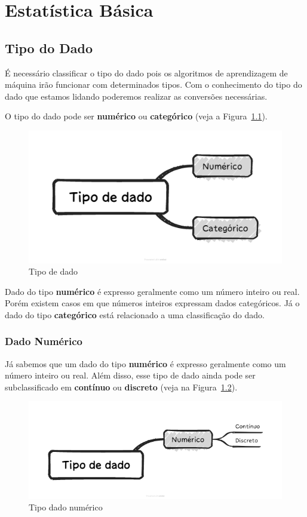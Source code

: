 \documentclass[a4paper,12pt]{book}
\begin{document}
	\chapter{Estatística Básica}
	
	\section{Tipo do Dado}
	
	É necessário classificar o tipo do dado pois os algoritmos de aprendizagem de máquina irão funcionar com determinados tipos. Com o conhecimento do tipo do dado que estamos lidando poderemos realizar as conversões necessárias. 
	
	O tipo do dado pode ser \textbf{numérico} ou \textbf{categórico} (veja a Figura~\ref{fig:tipodado}).
	
	\begin{figure}[!h]
		\centering
		\includegraphics[width=0.7\linewidth]{figuras/tipo_do_dado.png}
		\caption{Tipo de dado}
		\label{fig:tipodado}
	\end{figure}
	
	Dado do tipo \textbf{numérico} é expresso geralmente como um número inteiro ou real. Porém existem casos em que números inteiros expressam dados categóricos. Já o dado do tipo \textbf{categórico} está relacionado a uma classificação do dado. 
	
	\subsection{Dado Numérico}
	
	Já sabemos que um dado do tipo \textbf{numérico} é expresso geralmente como um número inteiro ou real. Além disso, esse tipo de dado ainda pode ser subclassificado em \textbf{contínuo} ou \textbf{discreto} (veja na Figura~\ref{fig:tipodadonumerico}). 
	
	\begin{figure}[!h]
		\centering
		\includegraphics[width=0.8\linewidth]{figuras/tipo_do_dado_numerico.png}
		\caption{Tipo dado numérico}
		\label{fig:tipodadonumerico}
	\end{figure}
	
\end{document}
